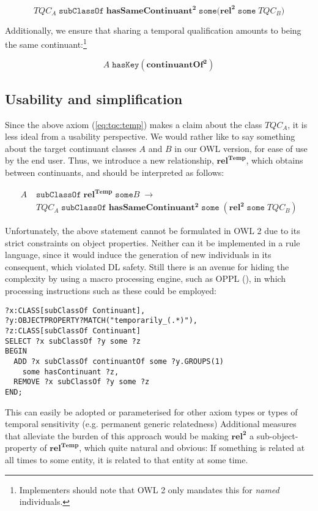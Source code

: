 \documentclass[10pt]{bmc_article}
\newcommand{\mirel}[1]{\ensuremath{\mathrm{\mathbf{#1}}}}
\newcommand{\mclass}[1]{\ensuremath{\mathit{#1}}}
\newcommand{\mrel}[2]{\mirel{#1^#2}}
\newcommand{\mrelb}[1]{\mrel{#1}{2}}
\newcommand{\TQC}[1]{\ensuremath{TQC_{\mclass{#1}}}}
\newcommand{\mreltemp}[1]{\mrel{#1}{{Temp}}}
\newenvironment{bmcformat}{\baselineskip20pt\sloppy\setboolean{publ}{false}}{\baselineskip20pt\sloppy}
\begin{document}
\begin{bmcformat}
\begin{equation}
\TQC{A}\;\mathtt{subClassOf}\;\mrelb{hasSameContinuant}\;\mathtt{some
(}\mrelb{rel}\;\mathtt{some}\;\TQC{B}) 
\label{eq:tqc:temp}
\end{equation}

Additionally, we ensure that sharing a temporal qualification amounts to being
the same continuant:\footnote{Implementers should note that OWL 2 only mandates
this for \emph{named} individuals.}

\begin{equation}
\mclass{A}\;\mathtt{hasKey}(\mrelb{continuantOf})
\end{equation}

\subsection*{Usability and simplification}
Since the above axiom (\ref{eq:tqc:temp}) makes a claim about the class \TQC{A},
it is less ideal from a usability perspective. We would rather like to say
something about the target continuant classes \mclass{A} and \mclass{B} in our OWL version, for
ease of use by the end user. Thus, we introduce a new relationship,
\mreltemp{rel}, which obtains between continuants, and should be interpreted as follows:


\begin{equation}
\begin{split}
\mclass{A}\;&\mathtt{subClassOf}\;\mreltemp{rel}\;\mathtt{some}\mclass{B}\;\rightarrow\\
&\TQC{A}\;\mathtt{subClassOf}\;\mrelb{hasSameContinuant}\;\mathtt{some}\;(\mrelb{rel}\;\mathtt{some}\;
\TQC{B}) 
\end{split}
\end{equation}

Unfortunately, the above statement cannot be formulated in OWL 2 due to its
strict constraints on object properties. Neither can it be implemented in a
rule language, since it would induce the generation of new individuals in its
consequent, which violated DL safety. Still there is an avenue for hiding the
complexity by using a macro processing engine, such as OPPL (\cite{OPPL}), in
which processing instructions such as these could be employed:

\begin{lstlisting}
?x:CLASS[subClassOf Continuant],
?y:OBJECTPROPERTY?MATCH("temporarily_(.*)"),
?z:CLASS[subClassOf Continuant]
SELECT ?x subClassOf ?y some ?z
BEGIN
  ADD ?x subClassOf continuantOf some ?y.GROUPS(1) 
    some hasContinuant ?z,
  REMOVE ?x subClassOf ?y some ?z
END;
\end{lstlisting}
This can easily be adopted or parameterised for other axiom types or types of temporal
sensitivity (e.g. permanent generic relatedness) Additional measures that alleviate the burden of this approach would be making
\mrelb{rel} a sub-object-property of \mreltemp{rel}, which quite natural and
obvious: If something is related at all times to some entity, it is related to
that entity at some time.



\end{bmcformat}
\end{document}
